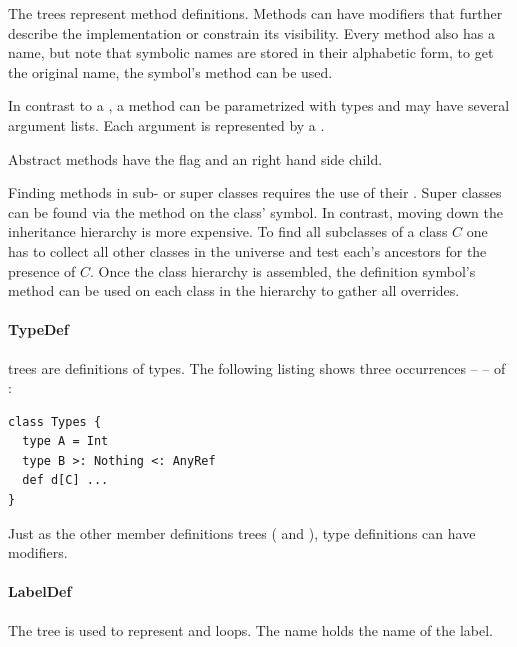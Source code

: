 \noindent The  trees represent method definitions. Methods can have modifiers that further describe the implementation or constrain its visibility. Every method also has a name, but note that symbolic names are stored in their alphabetic form, to get the original name, the symbol's  method can be used.

In contrast to a , a method can be parametrized with types and may have several argument lists. Each argument is represented by a .

Abstract methods have the \textsc{} flag and an  right hand side child.

Finding methods in sub- or super classes requires the use of their . Super classes can be found via the  method on the class' symbol. In contrast, moving down the inheritance hierarchy is more expensive. To find all subclasses of a class $C$ one has to collect all other classes in the universe and test each's ancestors for the presence of $C$. Once the class hierarchy is assembled, the definition symbol's  method can be used on each class in the hierarchy to gather all overrides.

\paragraph{TypeDef} 

\noindent {} trees are definitions of types. The following listing shows three occurrences --  -- of :

\begin{lstlisting}
class Types {
  type A = Int
  type B >: Nothing <: AnyRef
  def d[C] ...
}
\end{lstlisting}

Just as the other member definitions trees ( and ), type definitions can have modifiers.

\paragraph{LabelDef} 

\noindent The  tree is used to represent  and  loops. The name holds the name of the label.

